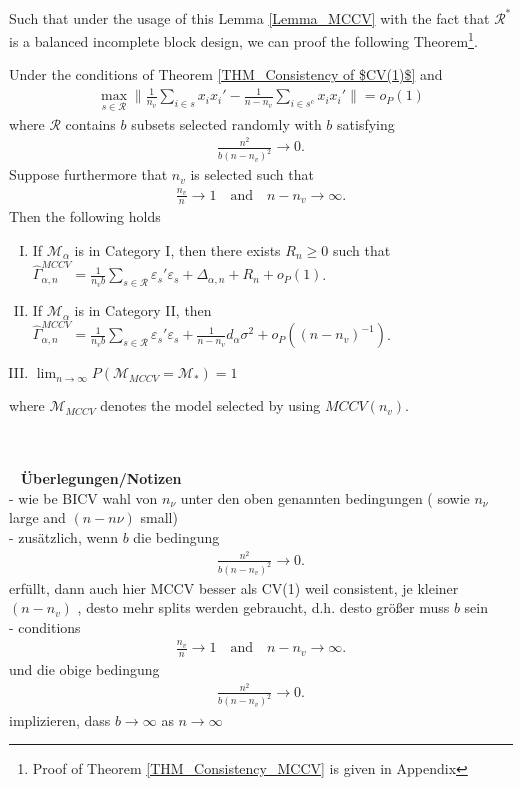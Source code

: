 \documentclass[Research_Module_ES.tex]{subfiles}
\begin{document}
Such that under the usage of this Lemma \ref{Lemma_MCCV} with the fact that $\mathcal{R}^\ast$ is a balanced incomplete block design, we can proof the following  Theorem\footnote{Proof of Theorem \ref{THM_Consistency_MCCV} is given in Appendix }. 


\begin{thm}
\label{THM_Consistency_MCCV}
Under the conditions of Theorem \ref{THM_Consistency of $CV(1)$} and
\begin{align*}
\max_{s\in \mathcal{R}}\biggl\lVert \frac{1}{n_v}\sum_{i\in s}x_ix_i' - \frac{1}{n-n_v}\sum_{i\in s^c}x_ix_i'\biggr\rVert =o_P(1)
\end{align*}
where $\mathcal{R}$ contains $b$ subsets selected randomly with $b$ satisfying
\begin{align*}
\frac{n^2}{b(n-n_v)^2}\to 0.
\end{align*}
Suppose furthermore that $n_v$ is selected such that
\begin{align*}
\frac{n_v}{n}\to 1 \quad \textrm{and} \quad n-n_v \to \infty.
\end{align*}
Then the following holds
\begin{enumerate}[(I)]
\item If $\mathcal{M}_\alpha$ is in Category I, then there exists $R_n \ge 0$ such that $\hat{\Gamma}_{\alpha,n}^{MCCV} = \frac{1}{n_vb}\sum_{s\in \mathcal{R}}\varepsilon_s'\varepsilon_s + \Delta_{\alpha,n} + R_n + o_P(1)$.
\item If $\mathcal{M}_\alpha$ is in Category II, then $\hat{\Gamma}_{\alpha,n}^{MCCV} = \frac{1}{n_vb}\sum_{s\in \mathcal{R}}\varepsilon_s'\varepsilon_s + \frac{1}{n-n_v}d_\alpha\sigma^2  + o_P((n-n_v)^{-1})$.
\item $\lim_{n\to\infty}P(\mathcal{M}_{MCCV}=\mathcal{M}_\ast) = 1$
\end{enumerate}
where $\mathcal{M}_{MCCV}$ denotes the model selected by using $MCCV(n_v)$.
\end{thm}

~\\\\~
\textbf{Überlegungen/Notizen}\\
- wie be BICV wahl von $n_\nu$ unter den oben genannten bedingungen ( sowie $n_\nu$ large and $(n-n\nu)$ small)\\
- zusätzlich, wenn $b$ die bedingung \begin{align*}
\frac{n^2}{b(n-n_v)^2}\to 0.
\end{align*}
erfüllt, dann auch hier MCCV besser als CV(1) weil consistent, je kleiner $(n-n_v)$ , desto mehr splits werden gebraucht, d.h. desto größer muss $b$ sein\\
- conditions
\begin{align*}
\frac{n_v}{n}\to 1 \quad \textrm{and} \quad n-n_v \to \infty.
\end{align*}
 und die obige bedingung 
 \begin{align*}
 \frac{n^2}{b(n-n_v)^2}\to 0.
 \end{align*}
 implizieren, dass $b\to \infty$ as $n\to\infty$
\end{document}
